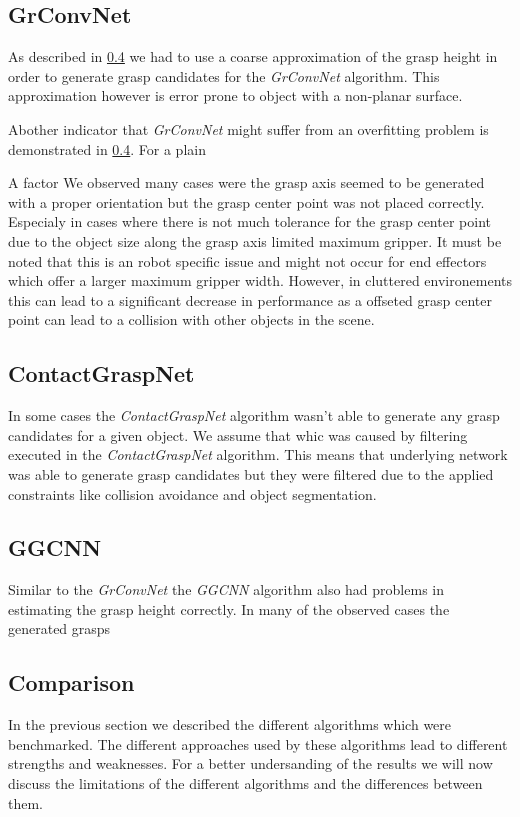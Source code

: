 \subsection{GrConvNet}
As described in \ref{} we had to use a coarse approximation of the grasp height in order to generate grasp candidates for the \textit{GrConvNet} algorithm.
This approximation however is error prone to object with a non-planar surface.

Abother indicator that \textit{GrConvNet} might suffer from an overfitting problem is demonstrated in \ref{}.
For a plain

A factor
We observed many cases were the grasp axis seemed to be generated with a proper orientation but the grasp center point was not placed correctly.
Especialy in cases where there is not much tolerance for the grasp center point due to the object size along the grasp axis limited maximum gripper.
It must be noted that this is an robot specific issue and might not occur for end effectors which offer a larger maximum gripper width.
However, in cluttered environements this can lead to a significant decrease in performance as a offseted grasp center point can lead to a collision
with other objects in the scene.

\subsection{ContactGraspNet}
In some cases the \textit{ContactGraspNet} algorithm wasn't able to generate any grasp candidates for a given object.
We assume that whic was caused by filtering executed in the \textit{ContactGraspNet} algorithm.
This means that underlying network was able to generate grasp candidates but they were filtered due to the applied constraints like collision avoidance
and object segmentation.


\subsection{GGCNN}
Similar to the \textit{GrConvNet} the \textit{GGCNN} algorithm also had problems in estimating the grasp height correctly.
In many of the observed cases the generated grasps

\subsection{Comparison}


In the previous section we described the different algorithms which were benchmarked.
The different approaches used by these algorithms lead to different strengths and weaknesses.
For a better undersanding of the results we will now discuss the limitations of the different algorithms and the differences between them.

